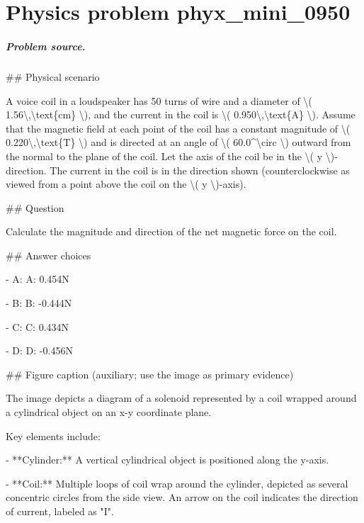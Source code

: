 
\chapter{Physics problem phyx\_mini\_0950}
\label{ch:PhyXMiniProblems_problem_phyx_mini_0950}

\paragraph{Problem source.}
\#\# Physical scenario

A voice coil in a loudspeaker has 50 turns of wire and a diameter of \textbackslash{}( 1.56\textbackslash{},\textbackslash{}text\{cm\} \textbackslash{}), and the current in the coil is \textbackslash{}( 0.950\textbackslash{},\textbackslash{}text\{A\} \textbackslash{}). Assume that the magnetic field at each point of the coil has a constant magnitude of \textbackslash{}( 0.220\textbackslash{},\textbackslash{}text\{T\} \textbackslash{}) and is directed at an angle of \textbackslash{}( 60.0\textasciicircum{}\textbackslash{}circ \textbackslash{}) outward from the normal to the plane of the coil. Let the axis of the coil be in the \textbackslash{}( y \textbackslash{})-direction. The current in the coil is in the direction shown (counterclockwise as viewed from a point above the coil on the \textbackslash{}( y \textbackslash{})-axis).

\#\# Question

Calculate the magnitude and direction of the net magnetic force on the coil.

\#\# Answer choices

- A: A: 0.454N

- B: B: -0.444N

- C: C: 0.434N

- D: D: -0.456N

\#\# Figure caption (auxiliary; use the image as primary evidence)

The image depicts a diagram of a solenoid represented by a coil wrapped around a cylindrical object on an x-y coordinate plane. 

Key elements include:

- **Cylinder:** A vertical cylindrical object is positioned along the y-axis.
  
- **Coil:** Multiple loops of coil wrap around the cylinder, depicted as several concentric circles from the side view. An arrow on the coil indicates the direction of current, labeled as "I".

